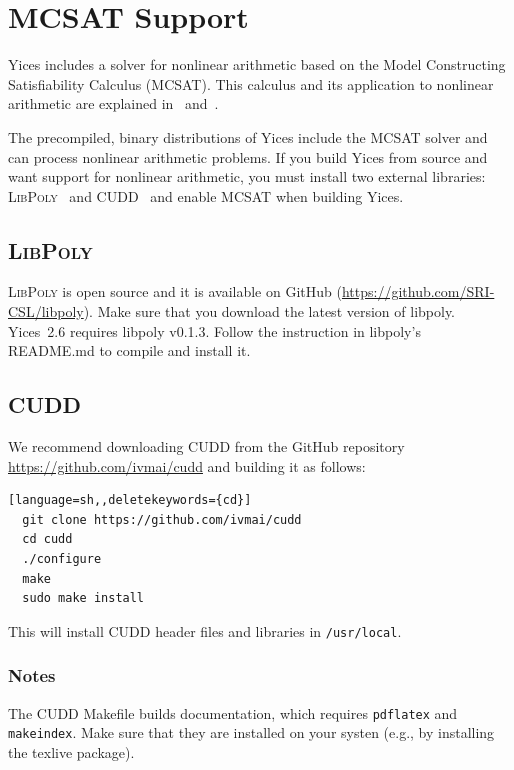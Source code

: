 \documentclass[11pt,twoside,fleqn,openright,titlepage]{cslreport}
\begin{document}
\section{MCSAT Support}
\label{mcsat-install}

Yices includes a solver for nonlinear arithmetic based on the Model
Constructing Satisfiability Calculus (MCSAT). This calculus and its
application to nonlinear arithmetic are explained
in~\cite{Jovanovic-etal:MCSATb:2013}
and~\cite{deMouraJovanovic:nla:2012}.

\medskip\noindent
The precompiled, binary distributions of Yices include the MCSAT
solver and can process nonlinear arithmetic problems. If you build
Yices from source and want support for nonlinear arithmetic, you must
install two external libraries: \textsc{LibPoly}~\cite{Jovanovic+Dutertre:libpoly:2017}
and CUDD~\cite{Somenzi:cudd:1998} and enable MCSAT when building Yices.

\subsection*{\textsc{LibPoly}}

\textsc{LibPoly} is open source and it is available on GitHub
(\url{https://github.com/SRI-CSL/libpoly}). Make sure that you
download the latest version of libpoly. Yices~2.6 requires libpoly
v0.1.3. Follow the instruction in libpoly's README.md to compile and
install it.

\subsection*{CUDD}

We recommend downloading CUDD from the GitHub repository
\url{https://github.com/ivmai/cudd} and building it as follows:
\begin{small}
\begin{lstlisting}[language=sh,,deletekeywords={cd}]
  git clone https://github.com/ivmai/cudd
  cd cudd
  ./configure
  make
  sudo make install
\end{lstlisting}
\end{small}
This will install CUDD header files and libraries in \texttt{/usr/local}.

\subsubsection*{Notes}
The CUDD Makefile builds documentation, which requires
\texttt{pdflatex} and \texttt{makeindex}. Make sure that they are
installed on your systen (e.g., by installing the texlive package).
\end{document}
